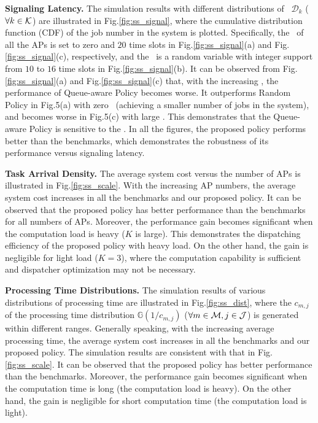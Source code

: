 \textbf{Signaling Latency.}
The simulation results with different distributions of \brlatency~$\mathcal{D}_{k}$ ($\forall k\in\mathcal{K}$) are illustrated in Fig.\ref{fig:ss_signal}, where the cumulative distribution function (CDF) of the job number in the system is plotted.
Specifically, the \brlatency~of all the APs is set to zero and $20$ time slots in Fig.\ref{fig:ss_signal}(a) and Fig.\ref{fig:ss_signal}(c), respectively, and the \brlatency~is a random variable with integer support from $10$ to $16$ time slots in Fig.\ref{fig:ss_signal}(b).
It can be observed from Fig.\ref{fig:ss_signal}(a) and Fig.\ref{fig:ss_signal}(c) that, with the increasing \brlatency, the performance of Queue-aware Policy becomes worse.
It outperforms Random Policy in Fig.5(a) with zero \brlatency~(achieving a smaller number of jobs in the system), and becomes worse in Fig.5(c) with large \brlatency.
This demonstrates that the Queue-aware Policy is sensitive to the \brlatency.
In all the figures, the proposed policy performs better than the benchmarks, which demonstrates the robustness of its performance versus signaling latency.

\textbf{Task Arrival Density.}
The average system cost versus the number of APs is illustrated in Fig.\ref{fig:ss_scale}.
With the increasing AP numbers, the average system cost increases in all the benchmarks and our proposed policy.
It can be observed that the proposed policy has better performance than the benchmarks for all numbers of APs.
Moreover, the performance gain becomes significant when the computation load is heavy ($K$ is large).
This demonstrates the dispatching efficiency of the proposed policy with heavy load.
On the other hand, the gain is negligible for light load ($K=3$), where the computation capability is sufficient and dispatcher optimization may not be necessary.

\textbf{Processing Time Distributions.}
The simulation results of various distributions of processing time are illustrated in Fig.\ref{fig:ss_dist}, where the $c_{m,j}$ of the processing time distribution $\mathbb{G}(1/c_{m,j})$ ($\forall m\in\mathcal{M},j\in\mathcal{J}$) is generated within different ranges.
Generally speaking, with the increasing average processing time, the average system cost increases in all the benchmarks and our proposed policy.
The simulation results are consistent with that in Fig.\ref{fig:ss_scale}.
It can be observed that the proposed policy has better performance than the benchmarks.
Moreover, the performance gain becomes significant when the computation time is long (the computation load is heavy).
On the other hand, the gain is negligible for short computation time (the computation load is light).

